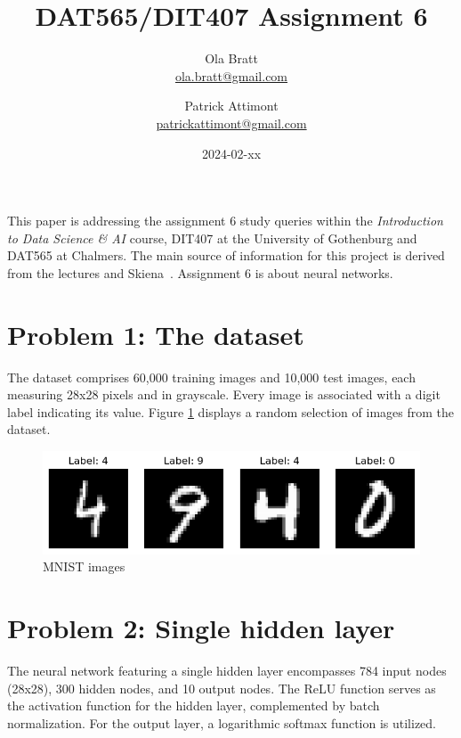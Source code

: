 \documentclass[a4paper]{article}
\begin{document}
\author{Ola Bratt \\
  \href{mailto:ola.bratt@gmail.com}{ola.bratt@gmail.com}
  \and
  Patrick Attimont \\
  \href{patrickattimont@gmail.com}{patrickattimont@gmail.com}
}

\title{DAT565/DIT407 Assignment 6}
\date{2024-02-xx}

\maketitle

This paper is addressing the assignment 6 study queries within the \emph{Introduction to Data Science \& AI} course, DIT407 at 
the University of Gothenburg and DAT565 at Chalmers. The main source of information for this project
is derived from the lectures and Skiena~\cite{Skiena:2024}. Assignment 6 is about neural networks.

\section*{Problem 1: The dataset}

The dataset comprises 60,000 training images and 10,000 test images, each measuring 28x28 pixels and in grayscale. 
Every image is associated with a digit label indicating its value. 
Figure \ref{fig:mnist_images} displays a random selection of images from the dataset.



\begin{figure}[H]
  \begin{center}
    \includegraphics[width=\textwidth]{ola/mnist_images.png}
    \caption{MNIST images}
    \label{fig:mnist_images}
  \end{center}
\end{figure}

\section*{Problem 2: Single hidden layer}

The neural network featuring a single hidden layer encompasses 784 input nodes (28x28), 300 hidden nodes, and 10 output nodes. 
The ReLU function serves as the activation function for the hidden layer, complemented by batch normalization. 
For the output layer, a logarithmic softmax function is utilized.
\end{document}
